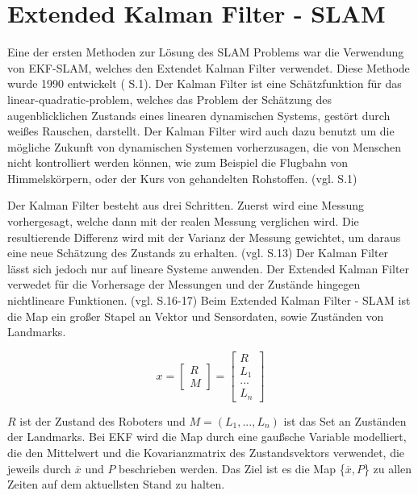  

\section{Extended Kalman Filter - SLAM}
Eine der ersten Methoden zur Lösung des SLAM Problems war die Verwendung von EKF-SLAM, welches den Extendet Kalman Filter verwendet. Diese Methode wurde 1990 entwickelt (\cite{orb_slam} S.1).
Der Kalman Filter ist eine Schätzfunktion für das \glqq linear-quadratic-problem\grqq , welches das Problem der Schätzung des augenblicklichen Zustands eines linearen dynamischen Systems, gestört durch weißes Rauschen, darstellt. Der Kalman Filter wird auch dazu benutzt um die mögliche Zukunft von dynamischen Systemen vorherzusagen, die von Menschen nicht kontrolliert werden können, wie zum Beispiel die Flugbahn von Himmelskörpern, oder der Kurs von gehandelten Rohstoffen. (vgl. \cite{ekf} S.1)

Der Kalman Filter besteht aus drei Schritten. Zuerst wird eine Messung vorhergesagt, welche dann mit der realen Messung verglichen wird. Die resultierende Differenz wird mit der Varianz der Messung gewichtet, um daraus eine neue Schätzung des Zustands zu erhalten. (vgl. \cite{slam_studi} S.13) Der Kalman Filter lässt sich jedoch nur auf lineare Systeme anwenden. Der Extended Kalman Filter verwedet für die Vorhersage der Messungen und der Zustände hingegen nichtlineare Funktionen. (vgl. \cite{slam_studi} S.16-17) Beim Extended Kalman Filter - SLAM ist die Map ein großer Stapel an Vektor und Sensordaten, sowie Zuständen von Landmarks.

\begin{equation}
  x =  \begin{bmatrix}
		R\\
		M
     	\end{bmatrix}
     = \begin{bmatrix}
		R\\
		L_1\\
		...\\
		L_n
     	\end{bmatrix}
\end{equation}

\( R\) ist der Zustand des Roboters und \( M = (L_1, ..., L_n)\)  ist das Set an Zuständen der Landmarks.
Bei EKF wird die Map durch eine gaußsche Variable modelliert, die den Mittelwert und die Kovarianzmatrix des Zustandsvektors verwendet, die jeweils durch \(\overline{x}\) und \(P\) beschrieben werden. Das Ziel ist es die Map \{\(\overline{x}, P\)\} zu allen Zeiten auf dem aktuellsten Stand zu halten.


